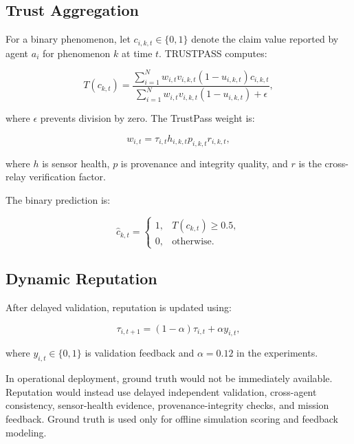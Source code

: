 \documentclass[10pt,conference]{IEEEtran}
\begin{document}
\subsection{Trust Aggregation}

For a binary phenomenon, let $c_{i,k,t}\in\{0,1\}$ denote the claim value reported by agent $a_i$ for phenomenon $k$ at time $t$. TRUSTPASS computes:

\begin{equation}
T(c_{k,t}) =
\frac{
\sum_{i=1}^{N}
w_{i,t}v_{i,k,t}(1-u_{i,k,t})c_{i,k,t}
}{
\sum_{i=1}^{N}
w_{i,t}v_{i,k,t}(1-u_{i,k,t})+\epsilon
},
\end{equation}

where $\epsilon$ prevents division by zero. The TrustPass weight is:

\begin{equation}
w_{i,t} =
\tau_{i,t}
h_{i,k,t}
p_{i,k,t}
r_{i,k,t},
\end{equation}

where $h$ is sensor health, $p$ is provenance and integrity quality, and $r$ is the cross-relay verification factor.

The binary prediction is:

\begin{equation}
\widehat{c}_{k,t} =
\begin{cases}
1, & T(c_{k,t})\geq 0.5,\\
0, & \text{otherwise}.
\end{cases}
\end{equation}

\subsection{Dynamic Reputation}

After delayed validation, reputation is updated using:

\begin{equation}
\tau_{i,t+1}
=
(1-\alpha)\tau_{i,t}
+
\alpha y_{i,t},
\end{equation}

where $y_{i,t}\in\{0,1\}$ is validation feedback and $\alpha=0.12$ in the experiments.

In operational deployment, ground truth would not be immediately available. Reputation would instead use delayed independent validation, cross-agent consistency, sensor-health evidence, provenance-integrity checks, and mission feedback. Ground truth is used only for offline simulation scoring and feedback modeling.
\end{document}
